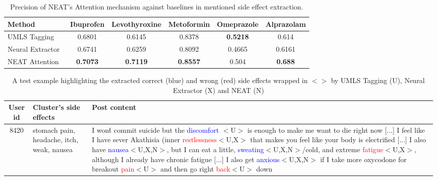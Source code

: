\documentclass{bmcart}
\begin{document}
\begin{table}[t!]
  \captionsetup{justification=centering}
  \centering
  \scalebox{1.2}
  \footnotesize
  \begin{tabular}{l||c|c|c|c|c}
    \hline
    \textbf{Method} & Ibuprofen & Levothyroxine & Metoformin & Omeprazole & Alprazolam \\ \hline \hline
    UMLS Tagging & 0.6801 & 0.6145 & 0.8378 & \textbf{0.5218} & 0.614 \\ \hline
    Neural Extractor~\cite{ding2018attentive} & 0.6741 & 0.6259 & 0.8092 & 0.4665 & 0.6161 \\ \hline
    NEAT Attention & \textbf{0.7073} & \textbf{0.7119} & \textbf{0.8557} & 0.504 & \textbf{0.688} \\ \hline
  \end{tabular}
  \caption{Precision of NEAT's Attention mechanism against baselines in mentioned side effect extraction.}\label{table:se_extraction}
\end{table}

\begin{table}[t!]
  \captionsetup{justification=centering}
  \centering
  \scalebox{1.2}
  \footnotesize
  \begin{tabular}{c|p{3cm}|p{7cm}}
    \hline
    User id & Cluster's side effects & Post content \\ \hline \hline
    8420 & stomach pain, headache, itch, weak, nausea & I won\'t commit suicide but the \textcolor{blue}{discomfort} $<$U$>$ is enough to make me want to die right now [...] I feel like I have sever Akathisia (inner \textcolor{red}{restlessness}$<$U,X$>$ that makes you feel like your body is electrified [...] I also have \textcolor{blue}{nausea}$<$U,X,N$>$, but I can eat a little, \textcolor{blue}{sweating}$<$U,X,N$>$/cold, and extreme \textcolor{red}{fatigue}$<$U,X$>$, although I already have chronic fatigue [...] I also get \textcolor{blue}{anxious}$<$U,X,N$>$ if I take more oxycodone for breakout \textcolor{red}{pain}$<$U$>$ and then go right \textcolor{red}{back}$<$U$>$ down \\ \hline
  \end{tabular}
  \caption{A test example highlighting the extracted correct (blue) and wrong (red) side effects wrapped in $<>$ by UMLS Tagging (U), Neural Extractor (X) and NEAT (N)}\label{table:extraction_ex}
\end{table}
\end{document}
